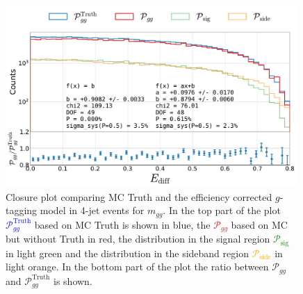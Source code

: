 \begin{figure}
  \centerfloat
  \includegraphics[width=0.99\textwidth, trim=10 0 20 5, clip, page=5]{figures/quarks/gtag-closure_test-down_sample=1.00-ML_vars=vertex-selection=b-ejet_min=4-n_iter_RS_lgb=99-n_iter_RS_xgb=9-cdot_cut=0.90-version=19-njet=4.pdf}
  \caption[Closure Plot Comparing MC Truth and the Efficiency Corrected $g$-Tagging Model in 4-Jet Events for $m_{gg}$]
          {Closure plot comparing MC Truth and the efficiency corrected $g$-tagging model in 4-jet events for $m_{gg}$. In the top part of the plot \textcolor{blue}{$\mathcal{P}_{gg}^\mathrm{Truth}$} based on MC Truth is shown in blue, the \textcolor{red}{$\mathcal{P}_{gg}$} based on MC but without Truth in red, the distribution in the signal region \textcolor{green}{$\mathcal{P}_{\mathrm{sig}}$} in light green and the distribution in the sideband region \textcolor{orange}{$\mathcal{P}_{\mathrm{side}}$} in light orange. In the bottom part of the plot the ratio between $\mathcal{P}_{gg}$ and $\mathcal{P}_{gg}^\mathrm{Truth}$  is shown. } 
  \label{fig:q:closure_m_gg}
\end{figure}
